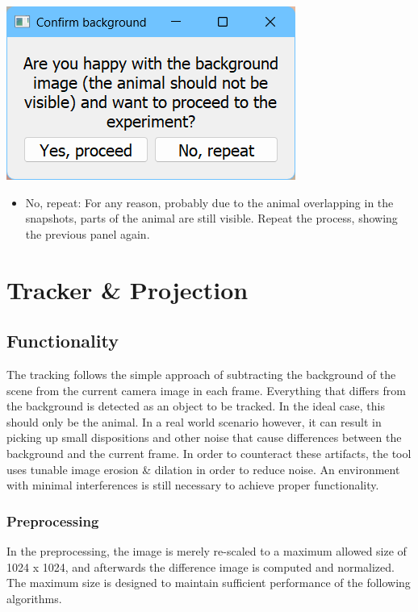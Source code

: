 \documentclass[12pt]{article}
\begin{document}
\hspace*{\fill}
\begin{minipage}[t]{0.45\textwidth}
	\vspace{0pt}
	\includegraphics*[width=\textwidth]{images/bcapconf.png}
\end{minipage}
\begin{itemize}
	\item No, repeat: For any reason, probably due to the animal overlapping in the snapshots, parts of the animal are still visible. Repeat the process, showing the previous panel again.
\end{itemize}



\section{Tracker \& Projection}

\subsection{Functionality}
The tracking follows the simple approach of subtracting the background of the scene from the current camera image in each frame. Everything that differs from the background is detected as an object to be tracked. In the ideal case, this should only be the animal. In a real world scenario however, it can result in picking up small dispositions and other noise that cause differences between the background and the current frame. In order to counteract these artifacts, the tool uses tunable image erosion \& dilation in order to reduce noise. An environment with minimal interferences is still necessary to achieve proper functionality.

\subsubsection*{Preprocessing}
In the preprocessing, the image is merely re-scaled to a maximum allowed size of 1024 x 1024, and afterwards the difference image is computed and normalized. The maximum size is designed to maintain sufficient performance of the following algorithms.
\end{document}
